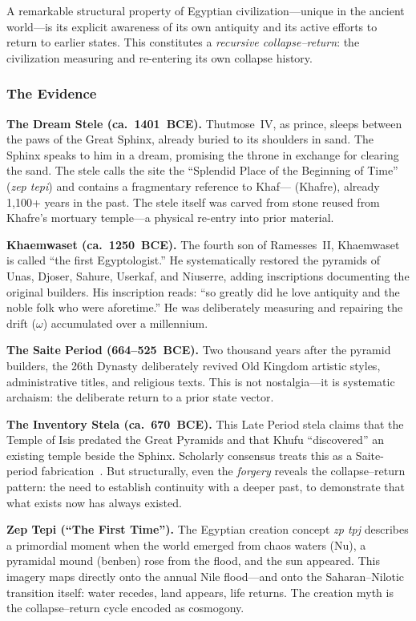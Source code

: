 \documentclass[
  aps,
  prd,
  twocolumn,
  superscriptaddress,
  nofootinbib,
  floatfix
]{revtex4-2}
\begin{document}
A remarkable structural property of Egyptian
civilization---unique in the ancient world---is its
explicit awareness of its own antiquity and its active
efforts to return to earlier states.  This constitutes
a \emph{recursive collapse--return}: the civilization
measuring and re-entering its own collapse history.

\subsubsection{The Evidence}

\textbf{The Dream Stele (ca.\ 1401~BCE).}
Thutmose~IV, as prince, sleeps between the paws of
the Great Sphinx, already buried to its shoulders in
sand.  The Sphinx speaks to him in a dream, promising
the throne in exchange for clearing the sand.  The
stele calls the site the ``Splendid Place of the
Beginning of Time'' (\emph{zep tepi}) and contains a
fragmentary reference to Khaf--- (Khafre), already
1,100+ years in the past.  The stele itself was carved
from stone reused from Khafre's mortuary temple---a
physical re-entry into prior material.

\textbf{Khaemwaset (ca.\ 1250~BCE).}  The fourth son
of Ramesses~II, Khaemwaset is called ``the first
Egyptologist.''  He systematically restored the
pyramids of Unas, Djoser, Sahure, Userkaf, and
Niuserre, adding inscriptions documenting the original
builders.  His inscription reads: ``so greatly did he
love antiquity and the noble folk who were
aforetime.''  He was deliberately measuring and
repairing the drift ($\omega$) accumulated over a
millennium.

\textbf{The Saite Period (664--525~BCE).}  Two
thousand years after the pyramid builders, the 26th
Dynasty deliberately revived Old Kingdom artistic
styles, administrative titles, and religious texts.
This is not nostalgia---it is systematic archaism:
the deliberate return to a prior state vector.

\textbf{The Inventory Stela (ca.\ 670~BCE).}  This
Late Period stela claims that the Temple of Isis
predated the Great Pyramids and that Khufu
``discovered'' an existing temple beside the Sphinx.
Scholarly consensus treats this as a Saite-period
fabrication~\cite{hawass1996sphinx}.  But
structurally, even the \emph{forgery} reveals the
collapse--return pattern: the need to establish
continuity with a deeper past, to demonstrate that
what exists now has always existed.

\textbf{Zep Tepi (``The First Time'').}  The Egyptian
creation concept \emph{zp tpj} describes a primordial
moment when the world emerged from chaos waters (Nu),
a pyramidal mound (benben) rose from the flood, and
the sun appeared.  This imagery maps directly onto the
annual Nile flood---and onto the Saharan--Nilotic
transition itself: water recedes, land appears, life
returns.  The creation myth is the collapse--return
cycle encoded as cosmogony.
\end{document}
